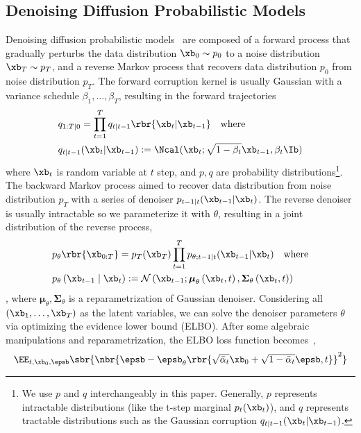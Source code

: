 \subsection{Denoising Diffusion Probabilistic Models} 
Denoising diffusion probabilistic models~\cite{sohl-dickstein2015deep,song2019generative,ho2020denoising} are composed of a forward process that gradually perturbs the data distribution $\xb_0\sim p_0$ to a noise distribution $\xb_T\sim p_T$, and a reverse Markov process that recovers data distribution $p_0$ from noise distribution $p_T$. The forward corruption kernel is usually Gaussian with a variance schedule $\beta_1,\dots,\beta_T$, resulting in the forward trajectories
\begin{align}
    &q_{{1:T|0}} = \prod_{t=1}^Tq_{t|t-1}\rbr{\xb_t|\xb_{t-1}} \quad \text{where}\notag\\
    &q_{t|t-1}(\xb_t|\xb_{t-1}) := \Ncal(\xb_t;\sqrt{1-\beta_t}\xb_{t-1},\beta_t\Ib)\label{eq:corruption_ddpm}
\end{align}
where $\xb_t$ is random variable at $t$ step, and $p, q$ are probability distributions\footnote{We use $p$ and $q$ interchangeably in this paper. Generally, $p$ represents intractable distributions (like the t-step marginal $p_t(\xb_t)$), and $q$ represents tractable distributions such as the Gaussian corruption $q_{t\mid t-1}(\xb_t|\xb_{t-1})$.}.
The backward Markov process aimed to recover data distribution from noise distribution $p_T$ with a series of denoiser $p_{t-1|t}(\xb_{t-1}|\xb_t)$. 
The reverse denoiser is usually intractable so we parameterize it with $\theta$, resulting in a joint distribution of the reverse process,
$$
\begin{aligned}
    &p_\theta\rbr{\xb_{0:T}}=p_T(\xb_T)\prod_{t=1}^Tp_{\theta;t-1|t}(\xb_{t-1}|\xb_{t})\quad\text{where}\\
    & p_\theta\left(\xb_{t-1} \mid \xb_t\right):=\mathcal{N}\left(\xb_{t-1} ; \boldsymbol{\mu}_\theta\left(\xb_t, t\right), \mathbf{\Sigma}_\theta\left(\xb_t, t\right)\right)
\end{aligned}
$$
, where $\boldsymbol{\mu}_\theta,\mathbf{\Sigma}_\theta$ is a reparametrization of Gaussian denoiser. Considering all $(\xb_1,\dots,\xb_T)$ as the latent variables, we can solve the denoiser parameters $\theta$ via optimizing the evidence lower bound (ELBO). After some algebraic manipulations and reparametrization, the ELBO loss function becomes~\cite{ho2020denoising},
\begin{equation}
    \EE_{t,\xb_0,\epsb}\sbr{\nbr{\epsb - \epsb_\theta\rbr{\sqrt{\bar\alpha_t}\xb_0 + \sqrt{1 - \bar\alpha_t}\epsb, t}}^2}\label{eq:ddpm_loss}
\end{equation}

